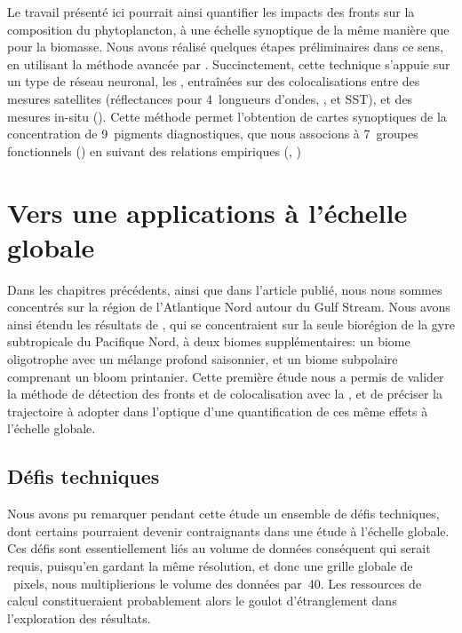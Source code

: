 Le travail présenté ici pourrait ainsi quantifier les impacts des fronts sur la composition du phytoplancton, à une échelle synoptique de la même manière que pour la biomasse.
Nous avons réalisé quelques étapes préliminaires dans ce sens, en utilisant la méthode avancée par \textcite{elhourany_2019,elhourany_2019a}.
Succinctement, cette technique s'appuie sur un type de réseau neuronal, les , entraînées sur des colocalisations entre des mesures satellites (réflectances pour 4~longueurs d'ondes, , et SST), et des mesures in-situ ().
Cette méthode permet l'obtention de cartes synoptiques de la concentration de 9~pigments diagnostiques, que nous associons à 7~groupes fonctionnels () en suivant des relations empiriques (, \cite{vidussi_2001,uitz_2006,brewin_2010,hirata_2011})

\section{Vers une applications à l'échelle globale}
\label{sec:appl-globale}

Dans les chapitres précédents, ainsi que dans l'article publié, nous nous sommes concentrés sur la région de l'Atlantique Nord autour du Gulf Stream.
Nous avons ainsi étendu les résultats de \textcite{liu_2016}, qui se concentraient sur la seule biorégion de la gyre subtropicale du Pacifique Nord, à deux biomes supplémentaires: un biome oligotrophe avec un mélange profond saisonnier, et un biome subpolaire comprenant un bloom printanier.
Cette première étude nous a permis de valider la méthode de détection des fronts et de colocalisation avec la , et de préciser la trajectoire à adopter dans l'optique d'une quantification de ces même effets à l'échelle globale.

\subsection{Défis techniques}

Nous avons pu remarquer pendant cette étude un ensemble de défis techniques, dont certains pourraient devenir contraignants dans une étude à l'échelle globale.
Ces défis sont essentiellement liés au volume de données conséquent qui serait requis, puisqu'en gardant la même résolution, et donc une grille globale de ~pixels, nous multiplierions le volume des données par~40.
Les ressources de calcul constitueraient probablement alors le goulot d'étranglement dans l'exploration des résultats.

